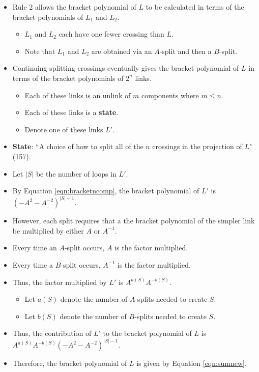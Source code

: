 \documentclass[titlepage]{article}
\numberwithin{figure}{section}
\numberwithin{table}{section}
\numberwithin{equation}{section}
\newcommand{\dq}[2]{``#1" (#2).}
\begin{document}
\begin{itemize}
    \item Rule 2 allows the bracket polynomial of $L$ to be calculated in terms of the bracket polynomials of $L_1$ and $L_2$.
    \begin{itemize}
        \item $L_1$ and $L_2$ each have one fewer crossing than $L$.
        \item Note that $L_1$ and $L_2$ are obtained via an $A$-split and then a $B$-split.
    \end{itemize}
    \item Continuing splitting crossings eventually gives the bracket polynomial of $L$ in terms of the bracket polynomials of $2^n$ links.
    \begin{itemize}
        \item Each of these links is an unlink of $m$ components where $m\leq n$.
        \item Each of these links is a \textbf{state}.
        \item Denote one of these links $L'$.
    \end{itemize}
    \item \textbf{State}: \dq{A choice of how to split all of the $n$ crossings in the projection of $L$}{157}
    \item Let $|S|$ be the number of loops in $L'$.
    \item By Equation \ref{eqn:bracketncomp}, the bracket polynomial of $L'$ is $\left(-A^2-A^{-2}\right)^{|S|-1}$.
    \item However, each split requires that a the bracket polynomial of the simpler link be multiplied by either $A$ or $A^{-1}$.
    \item Every time an $A$-split occurs, $A$ is the factor multiplied.
    \item Every time a $B$-split occurs, $A^{-1}$ is the factor multiplied.
    \item Thus, the factor multiplied by $L'$ is $A^{a(S)}A^{-b(S)}$.
    \begin{itemize}
        \item Let $a(S)$ denote the number of $A$-splits needed to create $S$.
        \item Let $b(S)$ denote the number of $B$-splits needed to create $S$.
    \end{itemize}
    \item Thus, the contribution of $L'$ to the bracket polynomial of $L$ is $A^{a(S)}A^{-b(S)}\left(-A^2-A^{-2}\right)^{|S|-1}$.
    \item Therefore, the bracket polynomial of $L$ is given by Equation \ref{eqn:sumnew}.

\end{itemize}
\end{document}

